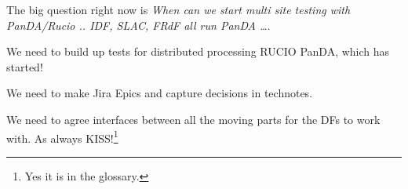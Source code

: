 The big question right now is {\em When can we start multi site testing with PanDA/Rucio ..
IDF, SLAC, FRdF all run PanDA \ldots}.

We need to build up tests for distributed processing RUCIO PanDA, which has started!


We need to make Jira Epics and capture decisions in technotes.

We need to agree interfaces between all the moving parts for the DFs to work with.
As always KISS!\footnote{Yes it is in the glossary.}


